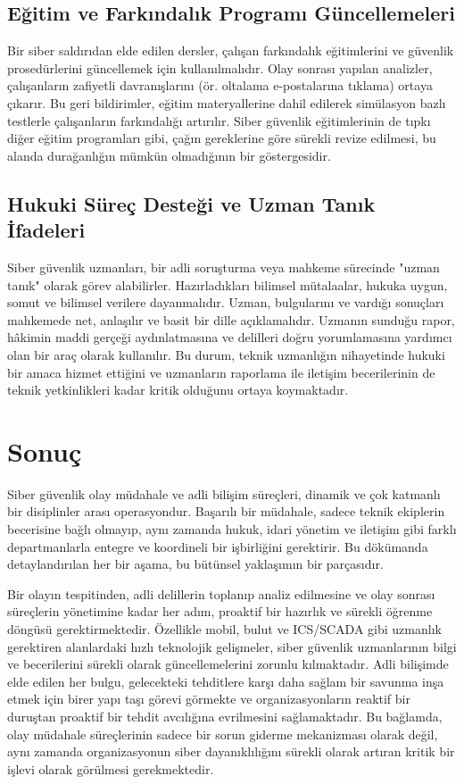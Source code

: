 \subsection{Eğitim ve Farkındalık Programı Güncellemeleri}

Bir siber saldırıdan elde edilen dersler, çalışan farkındalık eğitimlerini ve güvenlik prosedürlerini güncellemek için kullanılmalıdır. Olay sonrası yapılan analizler, çalışanların zafiyetli davranışlarını (ör. oltalama e-postalarına tıklama) ortaya çıkarır. Bu geri bildirimler, eğitim materyallerine dahil edilerek simülasyon bazlı testlerle çalışanların farkındalığı artırılır. Siber güvenlik eğitimlerinin de tıpkı diğer eğitim programları gibi, çağın gereklerine göre sürekli revize edilmesi, bu alanda durağanlığın mümkün olmadığının bir göstergesidir.

\subsection{Hukuki Süreç Desteği ve Uzman Tanık İfadeleri}

Siber güvenlik uzmanları, bir adli soruşturma veya mahkeme sürecinde "uzman tanık" olarak görev alabilirler. Hazırladıkları bilimsel mütalaalar, hukuka uygun, somut ve bilimsel verilere dayanmalıdır. Uzman, bulgularını ve vardığı sonuçları mahkemede net, anlaşılır ve basit bir dille açıklamalıdır. Uzmanın sunduğu rapor, hâkimin maddi gerçeği aydınlatmasına ve delilleri doğru yorumlamasına yardımcı olan bir araç olarak kullanılır. Bu durum, teknik uzmanlığın nihayetinde hukuki bir amaca hizmet ettiğini ve uzmanların raporlama ile iletişim becerilerinin de teknik yetkinlikleri kadar kritik olduğunu ortaya koymaktadır.

\section{Sonuç}

Siber güvenlik olay müdahale ve adli bilişim süreçleri, dinamik ve çok katmanlı bir disiplinler arası operasyondur. Başarılı bir müdahale, sadece teknik ekiplerin becerisine bağlı olmayıp, aynı zamanda hukuk, idari yönetim ve iletişim gibi farklı departmanlarla entegre ve koordineli bir işbirliğini gerektirir. Bu dökümanda detaylandırılan her bir aşama, bu bütünsel yaklaşımın bir parçasıdır.

Bir olayın tespitinden, adli delillerin toplanıp analiz edilmesine ve olay sonrası süreçlerin yönetimine kadar her adım, proaktif bir hazırlık ve sürekli öğrenme döngüsü gerektirmektedir. Özellikle mobil, bulut ve ICS/SCADA gibi uzmanlık gerektiren alanlardaki hızlı teknolojik gelişmeler, siber güvenlik uzmanlarının bilgi ve becerilerini sürekli olarak güncellemelerini zorunlu kılmaktadır. Adli bilişimde elde edilen her bulgu, gelecekteki tehditlere karşı daha sağlam bir savunma inşa etmek için birer yapı taşı görevi görmekte ve organizasyonların reaktif bir duruştan proaktif bir tehdit avcılığına evrilmesini sağlamaktadır. Bu bağlamda, olay müdahale süreçlerinin sadece bir sorun giderme mekanizması olarak değil, aynı zamanda organizasyonun siber dayanıklılığını sürekli olarak artıran kritik bir işlevi olarak görülmesi gerekmektedir.